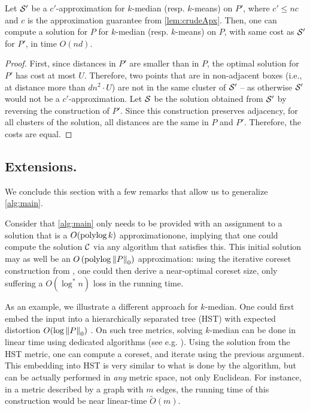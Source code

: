 \begin{lemma}
Let $\mathcal S'$ be a $c'$-approximation for  $k$-median (resp. $k$-means) on $P'$, where $c' \leq nc$ and $c$ is the approximation guarantee from \cref{lem:crudeApx}. Then, one can compute a solution for $P$ for $k$-median (resp. $k$-means) on $P$, with same cost as $\mathcal S'$ for $P'$, in time $O(nd)$.
\end{lemma}
\begin{proof}

First, since distances in $P'$ are smaller than in $P$, the optimal solution for $P'$ has cost at most $U$. Therefore, two points that are in non-adjacent boxes
(i.e., at distance more than $d n^2\cdot U$) are not in the same cluster of $\mathcal S'$ -- as otherwise $\mathcal S'$ would not be a $c'$-approximation.  Let $\mathcal S$ be
the solution obtained from $\mathcal S'$ by reversing the construction of $P'$. Since this construction preserves adjacency, for all clusters of the solution, all
distances are the same in $P$ and $P'$. Therefore, the costs are equal.

\end{proof}

\subsection*{Extensions.} 
We conclude this section with a few remarks that allow us to generalize \cref{alg:main}.

Consider that \cref{alg:main}  only needs to be provided with an assignment to a solution that is a $O(\operatorname{polylog} k)$ approximationone, implying that one could
compute the solution $\mathcal C$ via any algorithm that satisfies this.  This initial solution may as well be an $O\left(\operatorname{polylog} \left\| P \right\|_0 \right)$
approximation: using the iterative coreset construction from \cite{BravermanJKW21}, one could then derive a near-optimal coreset size, only suffering
a $O(\log^* n)$ loss in the running time.

As an example, we illustrate a different approach for $k$-median. One could first embed the input into a hierarchically separated tree (HST) with expected
distortion $O(\log \left\| P \right\|_0)$ \cite{FakcharoenpholRT03}. On such tree metrics, solving $k$-median can be done in linear time using dedicated algorithms
(see e.g. \cite{Cohen-AddadLNSS21}). Using the solution from the HST metric, one can compute a coreset, and iterate using the previous argument.  This embedding
into HST is very similar to what is done by the \fkmeans algorithm, but can be actually performed in \emph{any} metric space, not only Euclidean.  For instance,
in a metric described by a graph with $m$ edges, the running time of this construction would be near linear-time $\tilde O(m)$.
